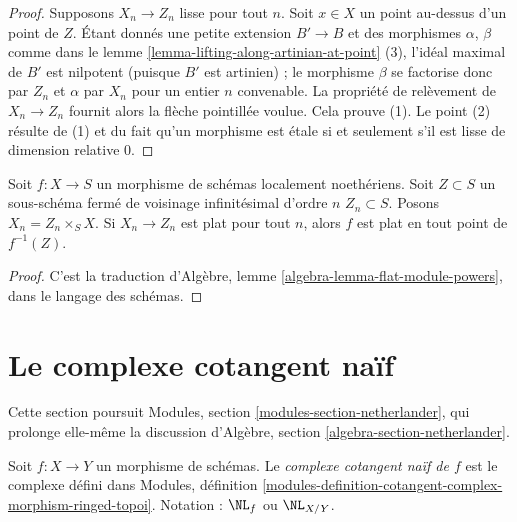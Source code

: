 \begin{proof}
Supposons $X_n \to Z_n$ lisse pour tout $n$.
Soit $x \in X$ un point au-dessus d'un point de $Z$.
Étant donnés une petite extension $B' \to B$ et des morphismes $\alpha$, $\beta$ comme dans
le lemme \ref{lemma-lifting-along-artinian-at-point} (3),
l'idéal maximal de $B'$ est nilpotent (puisque $B'$ est artinien) ;
le morphisme $\beta$ se factorise donc par $Z_n$ et $\alpha$
par $X_n$ pour un entier $n$ convenable. La propriété de relèvement de
$X_n \to Z_n$ fournit alors la flèche pointillée voulue.
Cela prouve (1). Le point (2) résulte de (1) et du fait qu'un morphisme
est étale si et seulement s'il est lisse de dimension relative $0$.
\end{proof}

\begin{lemma}
\label{lemma-check-flatness-on-infinitesimal-nbhds}
Soit $f : X \to S$ un morphisme de schémas localement noethériens.
Soit $Z \subset S$ un sous-schéma fermé de voisinage infinitésimal d'ordre $n$
$Z_n \subset S$. Posons $X_n = Z_n \times_S X$.
Si $X_n \to Z_n$ est plat pour tout $n$, alors $f$
est plat en tout point de $f^{-1}(Z)$.
\end{lemma}

\begin{proof}
C'est la traduction d'Algèbre, lemme \ref{algebra-lemma-flat-module-powers},
dans le langage des schémas.
\end{proof}










\section{Le complexe cotangent naïf}
\label{section-netherlander}

\noindent
Cette section poursuit
Modules, section \ref{modules-section-netherlander},
qui prolonge elle-même la discussion d'Algèbre,
section \ref{algebra-section-netherlander}.

\begin{definition}
\label{definition-netherlander}
Soit $f : X \to Y$ un morphisme de schémas.
Le {\it complexe cotangent naïf de $f$}
est le complexe défini dans Modules, définition
\ref{modules-definition-cotangent-complex-morphism-ringed-topoi}.
Notation : $\NL_f$ ou $\NL_{X/Y}$.
\end{definition}

